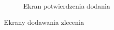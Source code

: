 \begin{figure}[htp!]
\begin{subfigure}[t]{0.32\textwidth}
    \caption{Ekran potwierdzenia dodania}
  \end{subfigure}
  \caption{Ekrany dodawania zlecenia}
  \label{fig:add-job}
\end{figure}